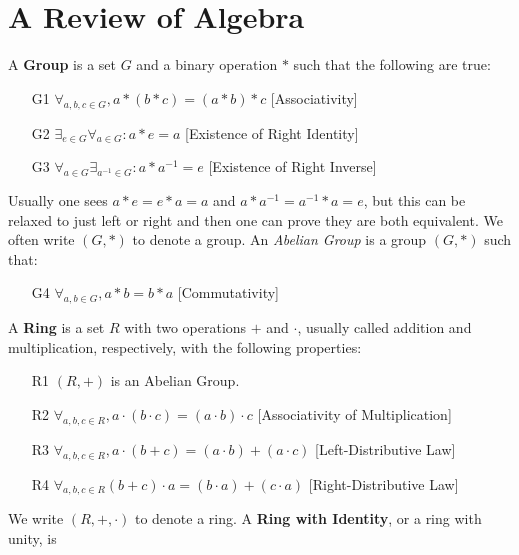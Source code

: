 \documentclass[crop=false,class=book,oneside]{standalone}
\begin{document}
    \section{A Review of Algebra}
        A \textbf{Group} is a set $G$ and a
        binary operation $*$ such
        that the following are true:
        \begin{enumerate}
            \item[G1] $\forall_{a,b,c\in{G}},%
                       a*(b*c)=(a*b)*c$
                      \hfill[Associativity]
            \item[G2] $\exists_{e\in{G}}\forall_{a\in{G}}:a*e=a$
                      \hfill[Existence of Right Identity]
            \item[G3] $\forall_{a\in{G}}\exists_{a^{-1}\in{G}}:%
                       a*a^{-1}=e$
                      \hfill[Existence of Right Inverse]
        \end{enumerate}
        Usually one sees $a*e=e*a=a$ and
        $a*a^{-1}=a^{-1}*a=e$, but this can be relaxed to just
        left or right and then one can prove they are both
        equivalent. We often write $(G,*)$ to denote a group.
        An \textit{Abelian Group} is a group $(G,*)$ such that:
        \begin{enumerate}
            \item[G4] $\forall_{a,b\in{G}},a*b=b*a$
                      \hfill[Commutativity]
        \end{enumerate}
        A \textbf{Ring} is a set $R$ with
        two operations $+$ and $\cdot$, usually called
        addition and multiplication, respectively,
        with the following properties:
        \begin{enumerate}
            \item[R1] $(R,+)$ is an Abelian Group.
            \item[R2] $\forall_{a,b,c\in{R}},%
                       a\cdot(b\cdot{c})=(a\cdot{b})\cdot{c}$
                      \hfill[Associativity of Multiplication]
            \item[R3] $\forall_{a,b,c\in{R}},%
                       a\cdot(b+c)=(a\cdot{b})+(a\cdot{c})$
                      \hfill[Left-Distributive Law]
            \item[R4] $\forall_{a,b,c\in{R}}%
                       (b+c)\cdot{a}=(b\cdot{a})+(c\cdot{a})$
                      \hfill[Right-Distributive Law]
        \end{enumerate}
        We write $(R,+,\cdot)$ to denote a ring.
        A \textbf{Ring with Identity}, or a ring with unity, is
\end{document}
